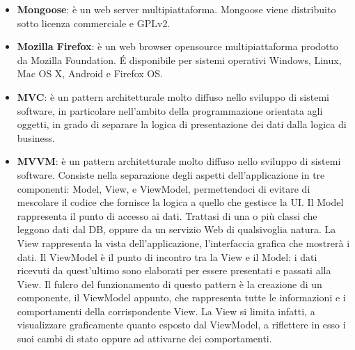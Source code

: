 \begin{itemize}
	\item
	\textbf{Mongoose}: è un web server multipiattaforma. Mongoose viene distribuito sotto licenza commerciale e GPLv2. 
	\item 
	\textbf{Mozilla Firefox}: è un web browser opensource multipiattaforma prodotto da Mozilla Foundation. \'E disponibile per sistemi operativi Windows, Linux, Mac OS X, Android e Firefox OS.
	\item
	\textbf{MVC}: è un pattern architetturale molto diffuso nello sviluppo di sistemi software, in particolare nell'ambito della programmazione orientata agli oggetti, in grado di separare la logica di presentazione dei dati dalla logica di business.
	\item
	\textbf{MVVM}:  è un pattern architetturale molto diffuso nello sviluppo di sistemi software. Consiste nella separazione degli aspetti dell'applicazione in tre componenti: Model,
	View, e	ViewModel, permettendoci di evitare di mescolare il codice che fornisce la logica a quello che gestisce la UI.
	Il Model rappresenta il punto di accesso ai dati. Trattasi di una o più classi che leggono dati dal DB, oppure da un servizio Web di qualsivoglia natura.
	La View rappresenta la vista dell’applicazione, l’interfaccia grafica che mostrerà i dati.
	Il ViewModel è il punto di incontro tra la View e il Model: i dati ricevuti da quest’ultimo sono elaborati per essere presentati e passati alla View.
	Il fulcro del funzionamento di questo pattern è la creazione di un componente, il ViewModel appunto, che rappresenta tutte le informazioni e i comportamenti della corrispondente View. La View si limita infatti, a visualizzare graficamente quanto esposto dal ViewModel, a riflettere in esso i suoi cambi di stato oppure ad attivarne dei comportamenti. 
\end{itemize}
